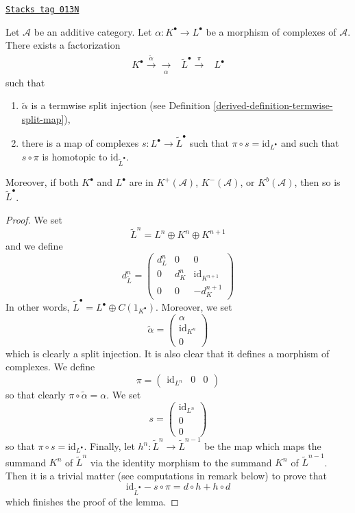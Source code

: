 \begin{lemma}
\label{derived-lemma-make-injective}
\href{https://stacks.math.columbia.edu/tag/013N}{\texttt{Stacks tag 013N}}

Let $\mathcal{A}$ be an additive category.
Let $\alpha : K^\bullet \to L^\bullet$ be a morphism
of complexes of $\mathcal{A}$.
There exists a factorization
$$
\begin{array}{ccc}K^\bullet \overset{\tilde \alpha}{\longrightarrow}\underset{\alpha}{\longrightarrow} & \tilde L^\bullet \overset{\pi}{\longrightarrow} & L^\bullet\end{array}
$$
such that
\begin{enumerate}
\item $\tilde \alpha$ is a termwise split injection (see
Definition \ref{derived-definition-termwise-split-map}),
\item there is a map of complexes $s : L^\bullet \to \tilde L^\bullet$
such that $\pi \circ s = \text{id}_{L^\bullet}$ and such that
$s \circ \pi$ is homotopic to $\text{id}_{\tilde L^\bullet}$.
\end{enumerate}
Moreover, if both $K^\bullet$ and $L^\bullet$ are in
$K^{+}(\mathcal{A})$, $K^{-}(\mathcal{A})$, or $K^b(\mathcal{A})$,
then so is $\tilde L^\bullet$.
\end{lemma}

\begin{proof}
We set
$$
\tilde L^n = L^n \oplus K^n \oplus K^{n + 1}
$$
and we define
$$
d^n_{\tilde L} =
\left(
\begin{matrix}
d^n_L & 0 & 0 \\
0 & d^n_K & \text{id}_{K^{n + 1}} \\
0 & 0 & -d^{n + 1}_K
\end{matrix}
\right)
$$
In other words, $\tilde L^\bullet = L^\bullet \oplus C(1_{K^\bullet})$.
Moreover, we set
$$
\tilde \alpha =
\left(
\begin{matrix}
\alpha \\
\text{id}_{K^n} \\
0
\end{matrix}
\right)
$$
which is clearly a split injection. It is also clear that it defines a morphism
of complexes. We define
$$
\pi =
\left(
\begin{matrix}
\text{id}_{L^n} &
0 &
0
\end{matrix}
\right)
$$
so that clearly $\pi \circ \tilde \alpha = \alpha$. We set
$$
s =
\left(
\begin{matrix}
\text{id}_{L^n} \\
0 \\
0
\end{matrix}
\right)
$$
so that $\pi \circ s = \text{id}_{L^\bullet}$. Finally,
let $h^n : \tilde L^n \to \tilde L^{n - 1}$ be the map
which maps the summand $K^n$ of $\tilde L^n$ via the identity morphism
to the summand $K^n$ of $\tilde L^{n - 1}$. Then it is a trivial matter
(see computations in remark below) to prove that
$$
\text{id}_{\tilde L^\bullet} - s \circ \pi
=
d \circ h + h \circ d
$$
which finishes the proof of the lemma.
\end{proof}

